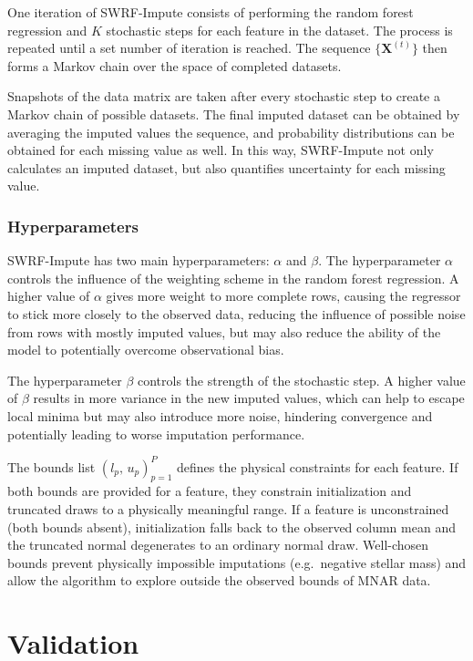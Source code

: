 \documentclass[preprint,longauthor,twocolumn]{aastex631}
\begin{document}
One iteration of SWRF-Impute consists of performing the random forest regression and $K$ stochastic steps for each feature in the dataset. The process is repeated until a set number of iteration is reached. The sequence $\{\mathbf{X}^{(t)}\}$ then forms a Markov chain over the space of completed datasets.

Snapshots of the data matrix are taken after every stochastic step to create a Markov chain of possible datasets. The final imputed dataset can be obtained by averaging the imputed values the sequence, and probability distributions can be obtained for each missing value as well. In this way, SWRF-Impute not only calculates an imputed dataset, but also quantifies uncertainty for each missing value.

\subsubsection{Hyperparameters}
SWRF-Impute has two main hyperparameters: $\alpha$ and $\beta$. The hyperparameter $\alpha$ controls the influence of the weighting scheme in the random forest regression. A higher value of $\alpha$ gives more weight to more complete rows, causing the regressor to stick more closely to the observed data, reducing the influence of possible noise from rows with mostly imputed values, but may also reduce the ability of the model to potentially overcome observational bias.

The hyperparameter $\beta$ controls the strength of the stochastic step. A higher value of $\beta$ results in more variance in the new imputed values, which can help to escape local minima but may also introduce more noise, hindering convergence and potentially leading to worse imputation performance.

The bounds list $(l_p,\, u_p)_{p=1}^{P}$ defines the physical constraints for each feature. If both bounds are provided for a feature, they constrain initialization and truncated draws to a physically meaningful range. If a feature is unconstrained (both bounds absent), initialization falls back to the observed column mean and the truncated normal degenerates to an ordinary normal draw. Well-chosen bounds prevent physically impossible imputations (e.g.\ negative stellar mass) and allow the algorithm to explore outside the observed bounds of MNAR data.

\section{Validation}
\end{document}
